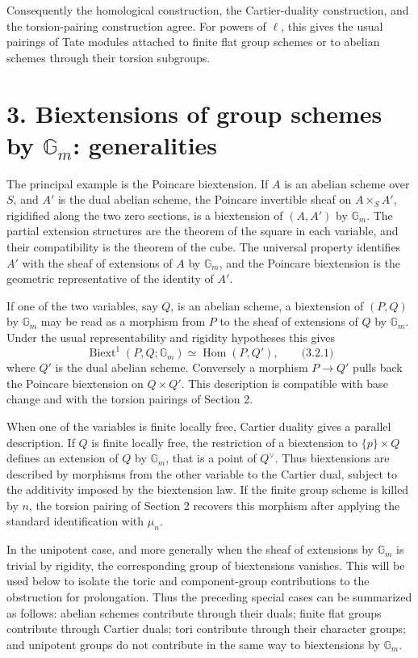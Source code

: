 \documentclass[11pt]{article}
\providecommand{\Gm}{\mathbb G_m}
\providecommand{\Hom}{\operatorname{Hom}}
\providecommand{\Biext}{\operatorname{Biext}}
\providecommand{\Hom}{\operatorname{Hom}}
\providecommand{\Gm}{\mathbb G_m}
\begin{document}
Consequently the homological construction, the Cartier-duality construction, and the torsion-pairing construction agree.  For powers of \(\ell\), this gives the usual pairings of Tate modules attached to finite flat group schemes or to abelian schemes through their torsion subgroups.

\section*{3. Biextensions of group schemes by \(\Gm\): generalities}

The principal example is the Poincare biextension.  If \(A\) is an abelian scheme over \(S\), and \(A'\) is the dual abelian scheme, the Poincare invertible sheaf on \(A\times_S A'\), rigidified along the two zero sections, is a biextension of \((A,A')\) by \(\Gm\).  The partial extension structures are the theorem of the square in each variable, and their compatibility is the theorem of the cube.  The universal property identifies \(A'\) with the sheaf of extensions of \(A\) by \(\Gm\), and the Poincare biextension is the geometric representative of the identity of \(A'\).

If one of the two variables, say \(Q\), is an abelian scheme, a biextension of \((P,Q)\) by \(\Gm\) may be read as a morphism from \(P\) to the sheaf of extensions of \(Q\) by \(\Gm\).  Under the usual representability and rigidity hypotheses this gives
\[
        \Biext^1(P,Q;\Gm)\simeq \Hom(P,Q'),
\qquad\text{(3.2.1)}
\]
where \(Q'\) is the dual abelian scheme.  Conversely a morphism \(P\to Q'\) pulls back the Poincare biextension on \(Q\times Q'\).  This description is compatible with base change and with the torsion pairings of Section 2.

When one of the variables is finite locally free, Cartier duality gives a parallel description.  If \(Q\) is finite locally free, the restriction of a biextension to \(\{p\}\times Q\) defines an extension of \(Q\) by \(\Gm\), that is a point of \(Q^\vee\).  Thus biextensions are described by morphisms from the other variable to the Cartier dual, subject to the additivity imposed by the biextension law.  If the finite group scheme is killed by \(n\), the torsion pairing of Section 2 recovers this morphism after applying the standard identification with \(\mu_n\).

In the unipotent case, and more generally when the sheaf of extensions by \(\Gm\) is trivial by rigidity, the corresponding group of biextensions vanishes.  This will be used below to isolate the toric and component-group contributions to the obstruction for prolongation.  Thus the preceding special cases can be summarized as follows: abelian schemes contribute through their duals; finite flat groups contribute through Cartier duals; tori contribute through their character groups; and unipotent groups do not contribute in the same way to biextensions by \(\Gm\).
\end{document}
